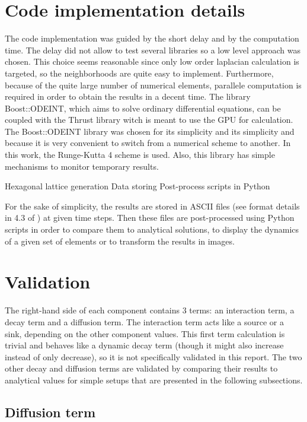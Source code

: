 \documentclass[a4paper]{article}
\begin{document}
\section{Code implementation details}

The code implementation was guided by the short delay and by the computation time. The delay did not allow to test several libraries so a low level approach was chosen. This choice seems reasonable since only low order laplacian calculation is targeted, so the neighborhoods are quite easy to implement. Furthermore, because of the quite large number of numerical elements, parallele computation is required in order to obtain the results in a decent time. The library Boost::ODEINT, which aims to solve ordinary differential equations, can be coupled with the Thrust library witch is meant to use the GPU for calculation. The Boost::ODEINT library was chosen for its simplicity and its simplicity and because it is very convenient to switch from a numerical scheme to another. In this work, the Runge-Kutta 4 scheme is used. Also, this library has simple mechanisms to monitor temporary results.

Hexagonal lattice generation
Data storing
Post-process scripts in Python

For the sake of simplicity, the results are stored in ASCII files (see format details in 4.3 of \cite{tecplot_dataformat_guide}) at given time steps. Then these files are post-processed using Python scripts in order to compare them to analytical solutions, to display the dynamics of a given set of elements or to transform the results in images.

\section{Validation}

The right-hand side of each component contains 3 terms: an interaction term, a decay term and a diffusion term. The interaction term acts like a source or a sink, depending on the other component values. This first term calculation is trivial and behaves like a dynamic decay term (though it might also increase instead of only decrease), so it is not specifically validated in this report. The two other decay and diffusion terms are validated by comparing their results to analytical values for simple setups that are presented in the following subsections.

\subsection{Diffusion term}
\end{document}
